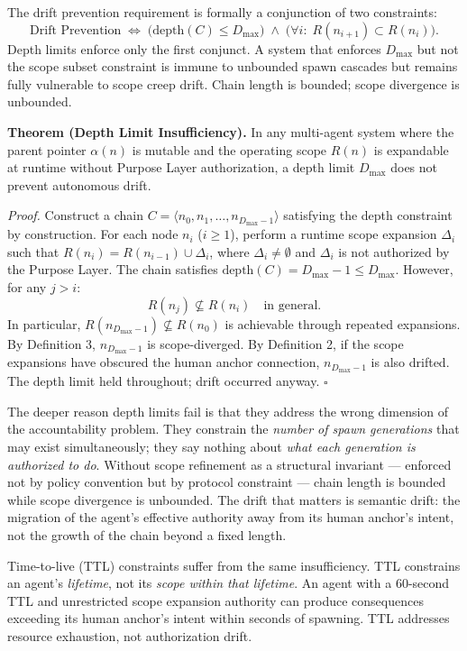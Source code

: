The drift prevention requirement is formally a conjunction of two constraints:
\[
\text{Drift Prevention} \;\iff\;
\bigl(\text{depth}(C) \leq D_{\max}\bigr) \;\land\;
\bigl(\forall i:\; R(n_{i+1}) \subset R(n_i)\bigr).
\tag{7}
\]
Depth limits enforce only the first conjunct.  A system that enforces $D_{\max}$ but not the scope subset constraint is immune to unbounded spawn cascades but remains fully vulnerable to scope creep drift.  Chain length is bounded; scope divergence is unbounded.

\medskip
\noindent\textbf{Theorem (Depth Limit Insufficiency).}  In any multi-agent system where the parent pointer $\alpha(n)$ is mutable and the operating scope $R(n)$ is expandable at runtime without Purpose Layer authorization, a depth limit $D_{\max}$ does not prevent autonomous drift.

\medskip
\noindent\textit{Proof.}  Construct a chain $C = \langle n_0, n_1, \ldots, n_{D_{\max}-1} \rangle$ satisfying the depth constraint by construction.  For each node $n_i$ ($i \geq 1$), perform a runtime scope expansion $\Delta_i$ such that $R(n_i) = R(n_{i-1}) \cup \Delta_i$, where $\Delta_i \neq \emptyset$ and $\Delta_i$ is not authorized by the Purpose Layer.  The chain satisfies $\text{depth}(C) = D_{\max} - 1 \leq D_{\max}$.  However, for any $j > i$:
\[
R(n_j) \not\subseteq R(n_i) \quad \text{in general.}
\tag{8}
\]
In particular, $R(n_{D_{\max}-1}) \not\subseteq R(n_0)$ is achievable through repeated expansions.  By Definition 3, $n_{D_{\max}-1}$ is scope-diverged.  By Definition 2, if the scope expansions have obscured the human anchor connection, $n_{D_{\max}-1}$ is also drifted.  The depth limit held throughout; drift occurred anyway.  $\square$

The deeper reason depth limits fail is that they address the wrong dimension of the accountability problem.  They constrain the \emph{number of spawn generations} that may exist simultaneously; they say nothing about \emph{what each generation is authorized to do}.  Without scope refinement as a structural invariant — enforced not by policy convention but by protocol constraint — chain length is bounded while scope divergence is unbounded.  The drift that matters is semantic drift: the migration of the agent's effective authority away from its human anchor's intent, not the growth of the chain beyond a fixed length.

Time-to-live (TTL) constraints suffer from the same insufficiency.  TTL constrains an agent's \emph{lifetime}, not its \emph{scope within that lifetime}.  An agent with a 60-second TTL and unrestricted scope expansion authority can produce consequences exceeding its human anchor's intent within seconds of spawning.  TTL addresses resource exhaustion, not authorization drift.

